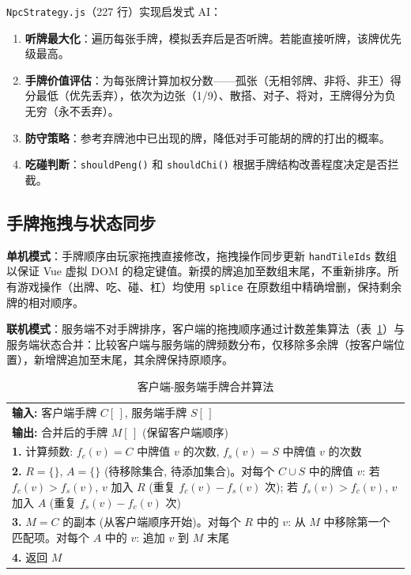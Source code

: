 \documentclass[11pt,a4paper]{article}
\begin{document}
\texttt{NpcStrategy.js}（227 行）实现启发式 AI：

\begin{enumerate}[nosep]
  \item \textbf{听牌最大化}：遍历每张手牌，模拟丢弃后是否听牌。若能直接听牌，该牌优先级最高。
  \item \textbf{手牌价值评估}：为每张牌计算加权分数——孤张（无相邻牌、非将、非王）得分最低（优先丢弃），依次为边张（1/9）、散搭、对子、将对，王牌得分为负无穷（永不丢弃）。
  \item \textbf{防守策略}：参考弃牌池中已出现的牌，降低对手可能胡的牌的打出的概率。
  \item \textbf{吃碰判断}：\texttt{shouldPeng()} 和 \texttt{shouldChi()} 根据手牌结构改善程度决定是否拦截。
\end{enumerate}

\subsection{手牌拖拽与状态同步}

\textbf{单机模式}：手牌顺序由玩家拖拽直接修改，拖拽操作同步更新 \texttt{handTileIds} 数组以保证 Vue 虚拟 DOM 的稳定键值。新摸的牌追加至数组末尾，不重新排序。所有游戏操作（出牌、吃、碰、杠）均使用 \texttt{splice} 在原数组中精确增删，保持剩余牌的相对顺序。

\textbf{联机模式}：服务端不对手牌排序，客户端的拖拽顺序通过计数差集算法（表~\ref{tab:algo_merge}）与服务端状态合并：比较客户端与服务端的牌频数分布，仅移除多余牌（按客户端位置），新增牌追加至末尾，其余牌保持原顺序。

\begin{table}[H]
\centering
\caption{客户端-服务端手牌合并算法}
\label{tab:algo_merge}
\small
\begin{tabular}{@{}p{}@{}}
\toprule
\textbf{输入:} 客户端手牌 $C[\,]$, 服务端手牌 $S[\,]$ \\
\textbf{输出:} 合并后的手牌 $M[\,]$ (保留客户端顺序) \\
\midrule
\textbf{1.} 计算频数: $f_c(v) = C$ 中牌值 $v$ 的次数, $f_s(v) = S$ 中牌值 $v$ 的次数 \\
\textbf{2.} $R = \{\}$, $A = \{\}$ (待移除集合, 待添加集合)。对每个 $C \cup S$ 中的牌值 $v$: 若 $f_c(v) > f_s(v)$, $v$ 加入 $R$ (重复 $f_c(v)-f_s(v)$ 次); 若 $f_s(v) > f_c(v)$, $v$ 加入 $A$ (重复 $f_s(v)-f_c(v)$ 次) \\
\textbf{3.} $M = C$ 的副本 (从客户端顺序开始)。对每个 $R$ 中的 $v$: 从 $M$ 中移除第一个匹配项。对每个 $A$ 中的 $v$: 追加 $v$ 到 $M$ 末尾 \\
\textbf{4.} 返回 $M$ \\
\bottomrule
\end{tabular}
\end{table}
\end{document}
